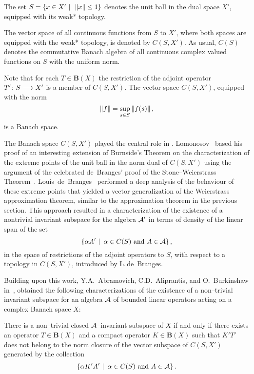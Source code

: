 \medskip
\goodbreak

The set $S=\left\{x\in X'\,\,|\,\,\,\left\Vert x\right\Vert\leq1\right\}$ denotes the unit ball in
the dual space $X'$, equipped with its weak* topology.

\begin{defn}
The vector space of all continuous functions from $S$ to $X'$, where both
spaces are equipped with the weak* topology, is denoted by $C(S,X')$. As
usual, $C(S)$ denotes the commutative Banach algebra of all continuous
complex valued functions on $S$ with the uniform norm.
\end{defn}

Note that for each $T\in \mathbf{B}(X)$ the restriction of the adjoint
operator $T'\colon S\longrightarrow X'$ is a member of $C(S,X')$. The vector space
$C(S,X')$, equipped with the norm
\[ \left\Vert f\right\Vert = \sup_{s\in S} \left\Vert f(s)\right\Vert, \]
is a Banach space.

\smallskip

The Banach space $C(S,X')$ played the central role in
\cite{AAB95,dB93,Lom91}. Lomonosov~\cite{Lom91} based his proof of an
interesting extension of Burnside's Theorem on the characterization of the
extreme points of the unit ball in the norm dual of $C(S,X')$ using the
argument of the celebrated de~Branges' proof of the Stone--Weierstrass
Theorem~\cite{dB59}. Louis~de~Branges~\cite{dB93} performed a deep analysis
of the behaviour of these extreme points that yielded a vector generalization
of the Weierstrass approximation theorem, similar to the approximation
theorem in the previous section. This approach resulted in a characterization
of the existence of a nontrivial invariant subspace for the algebra ${\cal A}'$ in
terms of density of the linear span of the set
\[ \left\{ \alpha A'\,\,|\,\,\, \alpha \in C(S) \text{ and } A \in {\cal A}\right\}, \]
in the space of restrictions of the adjoint operators to $S$, with respect to
a topology in $C(S,X')$, introduced by L.\,de~Branges.

\smallskip

Building upon this work, Y.A.~Abramovich, C.D.~Aliprantis, and O.~Burkinshaw
in~\cite{AAB95}, obtained the following characterizations of the existence of
a non--trivial invariant subspace for an algebra ${\cal A}$ of bounded linear
operators acting on a complex Banach space $X$:

\smallskip

\begin{thm}
\label{t:AAB1} There is a non--trivial closed ${\cal A}$--invariant subspace of $X$
if and only if there exists an operator $T\in \mathbf{B}(X)$ and a compact
operator $K\in \mathbf{B}(X)$ such that $K'T'$ does not belong to the norm
closure of the vector subspace of $C(S,X')$ generated by the collection
\[ \left\{\alpha K'A'\,\,|\,\,\, \alpha \in C(S) \text{ and } A \in {\cal A}\right\}. \]
\end{thm}

